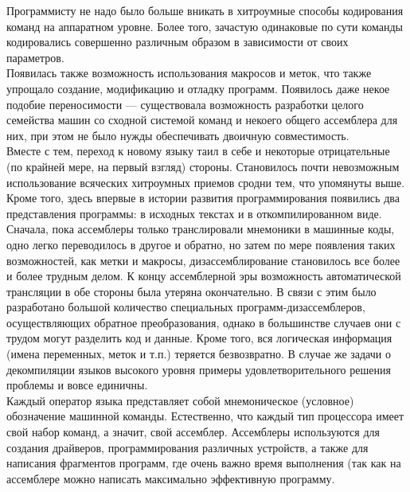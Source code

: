 Программисту не надо было больше вникать в хитроумные способы кодирования команд на аппаратном уровне. Более того, зачастую одинаковые по сути команды кодировались совершенно различным образом в зависимости от своих параметров. \\

Появилась также возможность использования макросов и меток, что также упрощало создание, модификацию и отладку программ. Появилось даже некое подобие переносимости — существовала возможность разработки целого семейства машин со сходной системой команд и некоего общего ассемблера для них, при этом не было нужды обеспечивать двоичную совместимость. \\

Вместе с тем, переход к новому языку таил в себе и некоторые отрицательные (по крайней мере, на первый взгляд) стороны. Становилось почти невозможным использование всяческих хитроумных приемов сродни тем, что упомянуты выше. \\

Кроме того, здесь впервые в истории развития программирования появились два представления программы: в исходных текстах и в откомпилированном виде. Сначала, пока ассемблеры только транслировали мнемоники в машинные коды, одно легко переводилось в другое и обратно, но затем по мере появления таких возможностей, как метки и макросы, дизассемблирование становилось все более и более трудным делом. К концу ассемблерной эры возможность автоматической трансляции в обе стороны была утеряна окончательно. В связи с этим было разработано большой количество специальных программ-дизассемблеров, осуществляющих обратное преобразования, однако в большинстве случаев они с трудом могут разделить код и данные. Кроме того, вся логическая информация (имена переменных, меток и т.п.) теряется безвозвратно. В случае же задачи о декомпиляции языков высокого уровня примеры удовлетворительного решения проблемы и вовсе единичны. \\

Каждый оператор языка представляет собой мнемоническое (условное) обозначение машинной команды. Естественно, что каждый тип процессора имеет свой набор команд, а значит, свой ассемблер. Ассемблеры используются для создания драйверов, программирования различных устройств, а также для написания фрагментов программ, где очень важно время выполнения (так как на ассемблере можно написать максимально эффективную программу. \\


